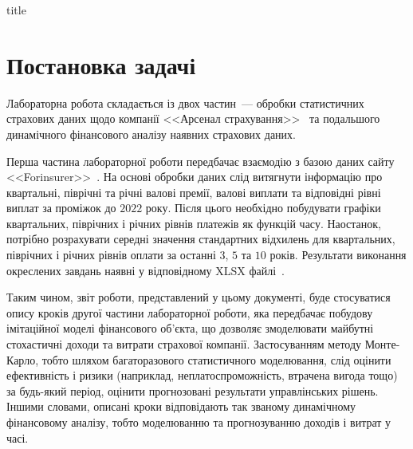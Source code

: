 \documentclass{mathreport}
\begin{document}




{title}

\tableofcontents

\newpage

\section*{Постановка задачі}

Лабораторна робота складається із двох частин~--- обробки статистичних страхових даних щодо компанії <<Арсенал страхування>>~\cite{arsenal-ic} та подальшого динамічного фінансового аналізу наявних страхових даних.

Перша частина лабораторної роботи передбачає взаємодію з базою даних сайту <<Forinsurer>>~\cite{forinsurer}. На основі обробки даних слід витягнути інформацію про квартальні, піврічні та річні валові премії, валові виплати та відповідні рівні виплат за проміжок до $2022$ року. Після цього необхідно побудувати графіки квартальних, піврічних і річних рівнів платежів як функцій часу. Наостанок, потрібно розрахувати середні значення стандартних відхилень для квартальних, піврічних і річних рівнів оплати за останні $3$, $5$ та $10$ років. Результати виконання окреслених завдань наявні у відповідному XLSX файлі~\cite{xlsx}. 

Таким чином, звіт роботи, представлений у цьому документі, буде стосуватися опису кроків другої частини лабораторної роботи, яка передбачає побудову імітаційної моделі фінансового об’єкта, що дозволяє змоделювати майбутні стохастичні доходи та витрати страхової компанії. Застосуванням методу Монте-Карло, тобто шляхом багаторазового статистичного моделювання, слід оцінити ефективність і ризики (наприклад, неплатоспроможність, втрачена вигода тощо) за будь-який період, оцінити прогнозовані результати управлінських рішень. Іншими словами, описані кроки відповідають так званому динамічному фінансовому аналізу, тобто моделюванню та прогнозуванню доходів і витрат у часі.
\end{document}
